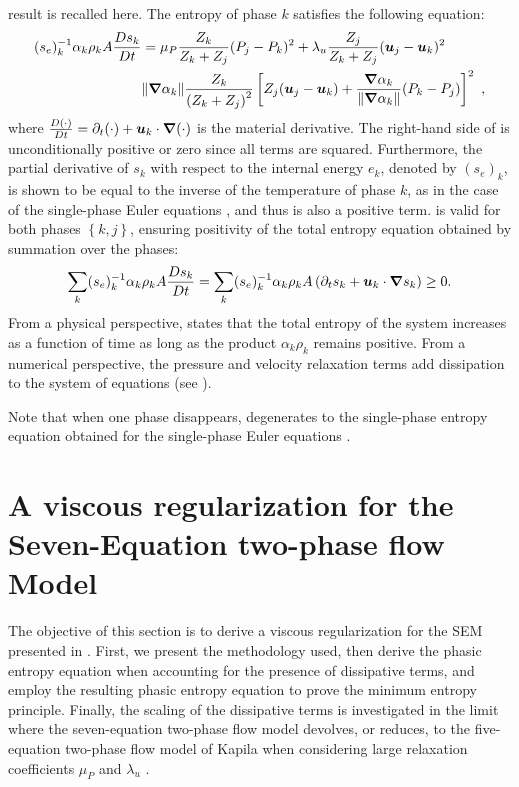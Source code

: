 result is recalled here. 
The entropy of phase $k$ satisfies the following equation:
%
\begin{align} \label{eq:ent-eqn-7-eqn-model}
(s_{e})_k^{-1} \alpha_k \rho_k A \frac{Ds_k}{Dt} &= \mu_P \frac{Z_k}{Z_k+Z_j} (P_j - P_k)^2 + \lambda_u \frac{Z_j}{Z_k+Z_j} (\boldsymbol u_j -\boldsymbol u_k)^2 \nonumber
\\
& \| \boldsymbol\nabla \alpha_k \| \frac{Z_k}{\left( Z_k+Z_j \right)^2} \left[ Z_j (\boldsymbol u_j-\boldsymbol u_k)+\frac{\boldsymbol\nabla \alpha_k}{\| \boldsymbol\nabla \alpha_k \|}(P_k-P_j)\right]^2 \ ,
\end{align}
%
where $\frac{D(\cdot) }{Dt} = \partial_t (\cdot) + \boldsymbol u_k \cdot \boldsymbol\nabla (\cdot)$ is the material derivative.
The right-hand side of  is unconditionally positive or zero since all terms are squared. Furthermore, 
the partial derivative of $s_k$ with respect to the internal energy $e_k$, denoted by $(s_e)_k$, is shown to be equal to the inverse of the temperature 
of phase $k$, as in the case of the single-phase Euler equations \cite{jlg_VR_SIAM_2004,Marco_dissertation}, and thus is also a positive term.
 is valid for both phases $\left\{k, j\right\}$, ensuring positivity of the total entropy equation obtained by summation over the phases:
%
\begin{equation}\label{eq:tot-ent-res-sct4}
\sum_k (s_{e})_k^{-1} \alpha_k \rho_k A \frac{Ds_k}{Dt} = \sum_k (s_{e})_k^{-1} \alpha_k \rho_k A \left( \partial_t s_k + \boldsymbol u_k \cdot \boldsymbol\nabla s_k \right) \geq 0  .
\end{equation}
%
From a physical perspective,  states that the total entropy of the system increases as a 
function of time as long as the product $\alpha_k \rho_k$ remains positive. From a numerical perspective, 
the pressure and velocity relaxation terms add dissipation to the system of equations (see ).

Note that when one phase disappears,  degenerates to the single-phase entropy equation obtained for the single-phase 
Euler equations \cite{SEM,Marco_dissertation}.

\section{A viscous regularization for the Seven-Equation two-phase flow Model}\label{sec:visc-regu}
%
The objective of this section is to derive a viscous regularization for the SEM presented in . First, we present the methodology used, 
then derive the phasic entropy equation when accounting for the presence of dissipative terms, and employ the resulting phasic entropy equation to prove 
the minimum entropy principle. Finally, the scaling of the dissipative terms is investigated in the limit where the seven-equation two-phase flow model 
devolves, or reduces, to the five-equation two-phase flow model of Kapila \cite{Kapila_2001} when considering large relaxation coefficients $\mu_P$ and $\lambda_u$ \cite{dellacherie}.
%
